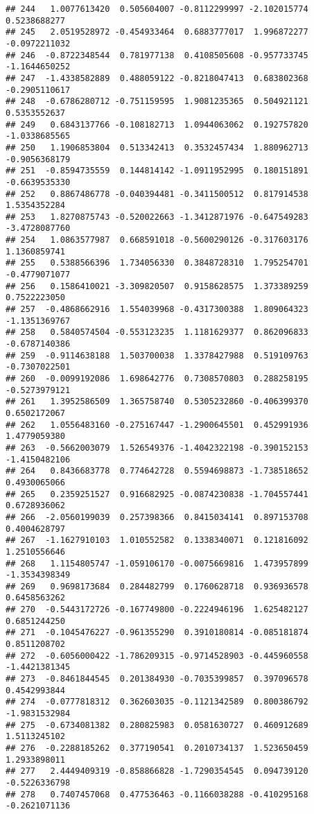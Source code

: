 \documentclass[
]{article}
\begin{document}
\begin{verbatim}
## 244   1.0077613420  0.505604007 -0.8112299997 -2.102015774  0.5238688277
## 245   2.0519528972 -0.454933464  0.6883777017  1.996872277 -0.0972211032
## 246  -0.8722348544  0.781977138  0.4108505608 -0.957733745 -1.1644650252
## 247  -1.4338582889  0.488059122 -0.8218047413  0.683802368 -0.2905110617
## 248  -0.6786280712 -0.751159595  1.9081235365  0.504921121  0.5353552637
## 249   0.6843137766 -0.108182713  1.0944063062  0.192757820 -1.0338685565
## 250   1.1906853804  0.513342413  0.3532457434  1.880962713 -0.9056368179
## 251  -0.8594735559  0.144814142 -1.0911952995  0.180151891 -0.6639535330
## 252   0.8867486778 -0.040394481 -0.3411500512  0.817914538  1.5354352284
## 253   1.8270875743 -0.520022663 -1.3412871976 -0.647549283 -3.4728087760
## 254   1.0863577987  0.668591018 -0.5600290126 -0.317603176  1.1360859741
## 255   0.5388566396  1.734056330  0.3848728310  1.795254701 -0.4779071077
## 256   0.1586410021 -3.309820507  0.9158628575  1.373389259  0.7522223050
## 257  -0.4868662916  1.554039968 -0.4317300388  1.809064323 -1.1351369767
## 258   0.5840574504 -0.553123235  1.1181629377  0.862096833 -0.6787140386
## 259  -0.9114638188  1.503700038  1.3378427988  0.519109763 -0.7307022501
## 260  -0.0099192086  1.698642776  0.7308570803  0.288258195 -0.5273979121
## 261   1.3952586509  1.365758740  0.5305232860 -0.406399370  0.6502172067
## 262   1.0556483160 -0.275167447 -1.2900645501  0.452991936  1.4779059380
## 263  -0.5662003079  1.526549376 -1.4042322198 -0.390152153 -1.4150482106
## 264   0.8436683778  0.774642728  0.5594698873 -1.738518652  0.4930065066
## 265   0.2359251527  0.916682925 -0.0874230838 -1.704557441  0.6728936062
## 266  -2.0560199039  0.257398366  0.8415034141  0.897153708  0.4004628797
## 267  -1.1627910103  1.010552582  0.1338340071  0.121816092  1.2510556646
## 268   1.1154805747 -1.059106170 -0.0075669816  1.473957899 -1.3534398349
## 269   0.9698173684  0.284482799  0.1760628718  0.936936578  0.6458563262
## 270  -0.5443172726 -0.167749800 -0.2224946196  1.625482127  0.6851244250
## 271  -0.1045476227 -0.961355290  0.3910180814 -0.085181874  0.8511208702
## 272  -0.6056000422 -1.786209315 -0.9714528903 -0.445960558 -1.4421381345
## 273  -0.8461844545  0.201384930 -0.7035399857  0.397096578  0.4542993844
## 274  -0.0777818312  0.362603035 -0.1121342589  0.800386792 -1.9831532984
## 275  -0.6734081382  0.280825983  0.0581630727  0.460912689  1.5113245102
## 276  -0.2288185262  0.377190541  0.2010734137  1.523650459  1.2933898011
## 277   2.4449409319 -0.858866828 -1.7290354545  0.094739120 -0.5226336798
## 278   0.7407457068  0.477536463 -0.1166038288 -0.410295168 -0.2621071136

\end{verbatim}
\end{document}
